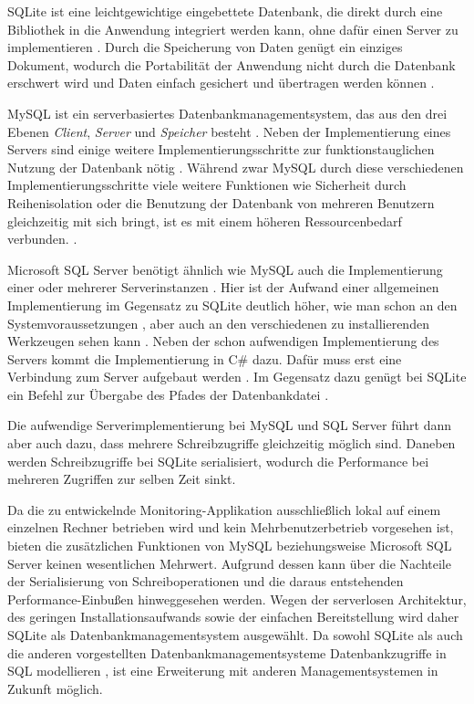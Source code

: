     	SQLite ist eine leichtgewichtige eingebettete Datenbank, die direkt durch eine Bibliothek in die Anwendung integriert werden kann, ohne dafür einen Server zu implementieren \autocite[1--2]{kreibichUsingSQLite2010}.
    	Durch die Speicherung von Daten genügt ein einziges Dokument, wodurch die Portabilität der Anwendung nicht durch die Datenbank erschwert wird und Daten einfach gesichert und übertragen werden können \autocite[3--4]{kreibichUsingSQLite2010}.
        
        MySQL ist ein serverbasiertes Datenbankmanagementsystem, das aus den drei Ebenen \textit{Client}, \textit{Server} und \textit{Speicher} besteht \autocite[4]{Vileikis}. Neben der Implementierung eines Servers sind einige weitere Implementierungsschritte zur funktionstauglichen Nutzung der Datenbank nötig \autocite[5--9]{Vileikis}.
        Während zwar MySQL durch diese verschiedenen Implementierungsschritte viele weitere Funktionen wie Sicherheit durch Reihenisolation oder die Benutzung der Datenbank von mehreren Benutzern gleichzeitig mit sich bringt, ist es mit einem höheren Ressourcenbedarf verbunden. \autocite[41--42]{Vileikis}.
        
        Microsoft SQL Server benötigt ähnlich wie MySQL auch die Implementierung einer oder mehrerer Serverinstanzen \autocite[36--37]{Panther}. Hier ist der Aufwand einer allgemeinen Implementierung im Gegensatz zu SQLite deutlich höher, wie man schon an den Systemvoraussetzungen \autocite[30]{Panther}, aber auch an den verschiedenen zu installierenden Werkzeugen sehen kann \autocite[31--56]{Panther}.
        Neben der schon aufwendigen Implementierung des Servers kommt die Implementierung in C\# dazu. Dafür muss erst eine Verbindung zum Server aufgebaut werden \autocite{dotnet-botSqlConnectionClassMicrosoftDataSqlClient}. Im Gegensatz dazu genügt bei SQLite ein Befehl zur Übergabe des Pfades der Datenbankdatei \autocite[4--5]{kreibichUsingSQLite2010}.
        
        Die aufwendige Serverimplementierung bei MySQL und SQL Server führt dann aber auch dazu, dass mehrere Schreibzugriffe gleichzeitig möglich sind. Daneben werden Schreibzugriffe bei SQLite serialisiert, wodurch die Performance bei mehreren Zugriffen zur selben Zeit sinkt. \autocite[13--14]{kreibichUsingSQLite2010}
        
        Da die zu entwickelnde Monitoring-Applikation ausschließlich lokal auf einem einzelnen Rechner betrieben wird und kein Mehrbenutzerbetrieb vorgesehen ist, bieten die zusätzlichen Funktionen von MySQL beziehungsweise Microsoft SQL Server keinen wesentlichen Mehrwert. Aufgrund dessen kann über die Nachteile der Serialisierung von Schreiboperationen und die daraus entstehenden Performance-Einbußen hinweggesehen werden. Wegen der serverlosen Architektur, des geringen Installationsaufwands sowie der einfachen Bereitstellung wird daher SQLite als Datenbankmanagementsystem ausgewählt. Da sowohl SQLite als auch die anderen vorgestellten Datenbankmanagementsysteme Datenbankzugriffe in SQL modellieren \autocite{SQLiteHomePage} \autocite{MySQLMySQL84} \autocite{MySQLMySQL84}, ist eine Erweiterung mit anderen Managementsystemen in Zukunft möglich.
        
